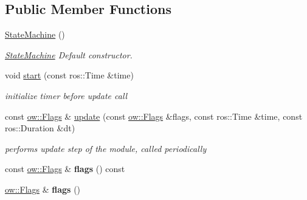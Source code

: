 \subsection*{Public Member Functions}
\begin{DoxyCompactItemize}
\item 
\hyperlink{classow__sm_1_1StateMachine_a4b026f2f193c1c69db33ba719d6bb4ad}{State\+Machine} ()\hypertarget{classow__sm_1_1StateMachine_a4b026f2f193c1c69db33ba719d6bb4ad}{}\label{classow__sm_1_1StateMachine_a4b026f2f193c1c69db33ba719d6bb4ad}

\begin{DoxyCompactList}\small\item\em \hyperlink{classow__sm_1_1StateMachine}{State\+Machine} Default constructor. \end{DoxyCompactList}\item 
void \hyperlink{classow__sm_1_1StateMachine_a84a76bd18c7d4c6c6c043ef908976498}{start} (const ros\+::\+Time \&time)
\begin{DoxyCompactList}\small\item\em initialize timer before update call \end{DoxyCompactList}\item 
const \hyperlink{classow__core_1_1Flags}{ow\+::\+Flags} \& \hyperlink{classow__sm_1_1StateMachine_a7040a24046ac224b73bca458b1107fc8}{update} (const \hyperlink{classow__core_1_1Flags}{ow\+::\+Flags} \&flags, const ros\+::\+Time \&time, const ros\+::\+Duration \&dt)
\begin{DoxyCompactList}\small\item\em performs update step of the module, called periodically \end{DoxyCompactList}\item 
const \hyperlink{classow__core_1_1Flags}{ow\+::\+Flags} \& {\bfseries flags} () const \hypertarget{classow__sm_1_1StateMachine_a541854a5a1ecbe4ca8ffbd397d56ab2b}{}\label{classow__sm_1_1StateMachine_a541854a5a1ecbe4ca8ffbd397d56ab2b}

\item 
\hyperlink{classow__core_1_1Flags}{ow\+::\+Flags} \& {\bfseries flags} ()\hypertarget{classow__sm_1_1StateMachine_a930a10a04092b6a87b6f5cb9a9e79472}{}\label{classow__sm_1_1StateMachine_a930a10a04092b6a87b6f5cb9a9e79472}

\end{DoxyCompactItemize}
